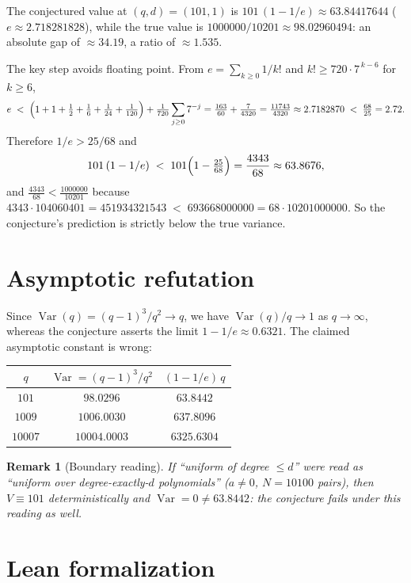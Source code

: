 \documentclass[11pt]{article}
\newtheorem{remark}{Remark}
\begin{document}
The conjectured value at $(q,d)=(101,1)$ is $101\,(1-1/e)\approx 63.84417644$ ($e\approx 2.718281828$), while the true value is $1000000/10201\approx 98.02960494$: an absolute gap of $\approx 34.19$, a ratio of $\approx 1.535$.

The key step avoids floating point. From $e=\sum_{k\ge0}1/k!$ and $k!\ge 720\cdot 7^{\,k-6}$ for $k\ge 6$,
\[
e \;<\; \Bigl(1+1+\tfrac12+\tfrac16+\tfrac1{24}+\tfrac1{120}\Bigr)+\tfrac1{720}\sum_{j\ge0}7^{-j}
=\tfrac{163}{60}+\tfrac{7}{4320}=\tfrac{11743}{4320}\approx 2.7182870\;<\;\tfrac{68}{25}=2.72 .
\]
Therefore $1/e>25/68$ and
\[
101\,(1-1/e)\;<\;101\Bigl(1-\tfrac{25}{68}\Bigr)=\frac{4343}{68}\approx 63.8676 ,
\]
and $\tfrac{4343}{68}<\tfrac{1000000}{10201}$ because
$4343\cdot 104060401=451934321543\;<\;693668000000=68\cdot 10201000000$.
So the conjecture's prediction is strictly below the true variance.

\section{Asymptotic refutation}\label{sec:asym}

Since $\operatorname{Var}(q)=(q-1)^3/q^2\to q$, we have $\operatorname{Var}(q)/q\to 1$ as $q\to\infty$, whereas the conjecture asserts the limit $1-1/e\approx 0.6321$. The claimed asymptotic constant is wrong:

\begin{center}
\begin{tabular}{ccc}
\toprule
$q$ & $\operatorname{Var}=(q-1)^3/q^2$ & $(1-1/e)\,q$\\
\midrule
$101$   & $98.0296$    & $63.8442$\\
$1009$  & $1006.0030$  & $637.8096$\\
$10007$ & $10004.0003$ & $6325.6304$\\
\bottomrule
\end{tabular}
\end{center}

\begin{remark}[Boundary reading]
If ``uniform of degree $\le d$'' were read as ``uniform over degree-\emph{exactly}-$d$ polynomials'' ($a\neq 0$, $N=10100$ pairs), then $V\equiv 101$ deterministically and $\operatorname{Var}=0\neq 63.8442$: the conjecture fails under this reading as well.
\end{remark}

\section{Lean formalization}
\end{document}
